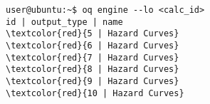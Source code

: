 \begin{Verbatim}[frame=single, commandchars=\\\{\}, fontsize=\small]
user@ubuntu:~$ oq engine --lo <calc_id>
id | output_type | name
\textcolor{red}{5 | Hazard Curves}
\textcolor{red}{6 | Hazard Curves}
\textcolor{red}{7 | Hazard Curves}
\textcolor{red}{8 | Hazard Curves}
\textcolor{red}{9 | Hazard Curves}
\textcolor{red}{10 | Hazard Curves}
\end{Verbatim}